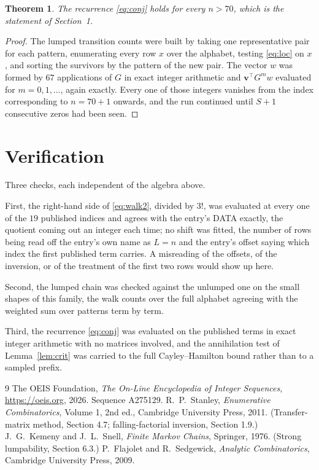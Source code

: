 \documentclass[11pt,a4paper]{article}
\theoremstyle{plain}
\newtheorem{theorem}{Theorem}
\theoremstyle{definition}
\begin{document}
\begin{theorem}
The recurrence \eqref{eq:conj} holds for every $n>70$, which is the statement of
Section~1.
\end{theorem}

\begin{proof}
The lumped transition counts were built by taking one representative pair for each pattern,
enumerating every row $x$ over the alphabet, testing \eqref{eq:loc} on $x$, and sorting
the survivors by the pattern of the new pair. The vector $w$ was formed by $67$
applications of $G$ in exact integer arithmetic and $\mathbf{v}^{\!\top}G^{m}w$
evaluated for $m=0,1,\dots$, again exactly. Every one of those integers vanishes from the
index corresponding to $n=70+1$ onwards, and the run continued until $S+1$ consecutive
zeros had been seen.
\end{proof}

\section{Verification}

Three checks, each independent of the algebra above.

First, the right-hand side of \eqref{eq:walk2}, divided by $3!$, was evaluated at every
one of the $19$ published indices and agrees with the entry's DATA exactly, the quotient
coming out an integer each time; no shift was fitted, the number of rows being read off the
entry's own name as $L=n$ and the entry's offset saying which index the first published
term carries. A misreading of the offsets, of the inversion, or of the treatment of the first
two rows would show up here.

Second, the lumped chain was checked against the unlumped one on the small shapes of this
family, the walk counts over the full alphabet agreeing with the weighted sum over patterns
term by term.

Third, the recurrence \eqref{eq:conj} was evaluated on the published terms in exact integer
arithmetic with no matrices involved, and the annihilation test of Lemma~\ref{lem:crit} was
carried to the full Cayley--Hamilton bound rather than to a sampled prefix.

\begin{thebibliography}{9}
 The OEIS Foundation, \emph{The On-Line Encyclopedia of Integer
Sequences}, \url{https://oeis.org}, 2026. Sequence A275129.
 R.~P.~Stanley, \emph{Enumerative Combinatorics}, Volume 1, 2nd ed.,
Cambridge University Press, 2011. (Transfer-matrix method, Section 4.7; falling-factorial
inversion, Section 1.9.)
 J.~G.~Kemeny and J.~L.~Snell, \emph{Finite Markov Chains}, Springer,
1976. (Strong lumpability, Section 6.3.)
 P.~Flajolet and R.~Sedgewick, \emph{Analytic Combinatorics}, Cambridge
University Press, 2009.
\end{thebibliography}
\end{document}
